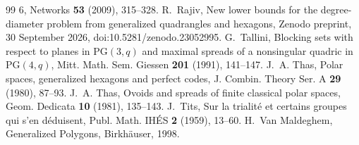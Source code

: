 \documentclass[11pt]{amsart}
\theoremstyle{definition}
\theoremstyle{remark}
\numberwithin{equation}{section}
\newcommand{\PG}{\mathrm{PG}}
\begin{document}
\begin{thebibliography}{99}
6, Networks \textbf{53} (2009), 315--328.
 R.~Rajiv, New lower bounds for the degree-diameter problem from generalized quadrangles and hexagons, Zenodo
preprint, 30 September 2026, doi:10.5281/zenodo.23052995.
 G.~Tallini, Blocking sets with respect to planes in $\PG(3,q)$ and maximal spreads of a nonsingular quadric
in $\PG(4,q)$, Mitt. Math. Sem. Giessen \textbf{201} (1991), 141--147.
 J.~A. Thas, Polar spaces, generalized hexagons and perfect codes, J. Combin. Theory Ser. A \textbf{29}
(1980), 87--93.
 J.~A. Thas, Ovoids and spreads of finite classical polar spaces, Geom. Dedicata \textbf{10} (1981),
135--143.
 J.~Tits, Sur la trialit\'e et certains groupes qui s'en d\'eduisent, Publ. Math. IH\'ES \textbf{2} (1959),
13--60.
 H.~Van Maldeghem, Generalized Polygons, Birkh\"auser, 1998.

\end{thebibliography}
\end{document}
